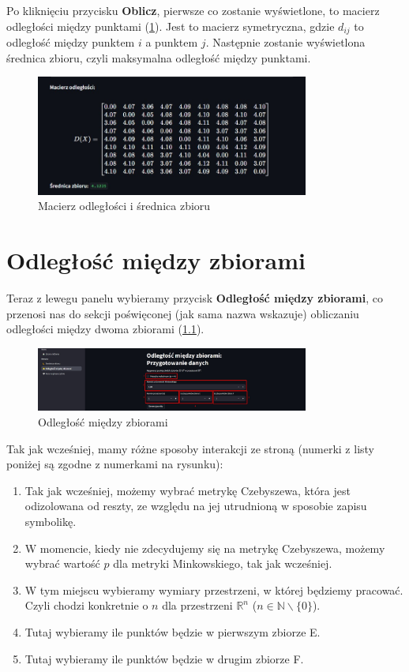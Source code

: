 \documentclass[article,11pt]{mwrep}
\newcommand{\R}{{\mathbb R}}
\newcommand{\N}{{\mathbb N}}
\begin{document}
Po kliknięciu przycisku \textbf{Oblicz}, pierwsze co zostanie wyświetlone, to macierz odległości między punktami (\ref{rys:mo}). Jest to macierz symetryczna, gdzie $d_{ij}$ to odległość między punktem $i$ a punktem $j$. Następnie zostanie wyświetlona średnica zbioru, czyli maksymalna odległość między punktami.

\begin{figure}[H] 
    \centering
    \includegraphics[width=0.8\textwidth]{figure/Screenshot_4.jpg}
    \caption{Macierz odległości i średnica zbioru}\label{rys:mo}
\end{figure}

\chapter{Odległość między zbiorami}

Teraz z lewegu panelu wybieramy przycisk \textbf{Odległość między zbiorami}, co przenosi nas do sekcji poświęconej (jak sama nazwa wskazuje) obliczaniu odległości między dwoma zbiorami (\ref{rys:omz}). 

\begin{figure}[H] 
    \centering
    \includegraphics[width=0.8\textwidth]{figure/Screenshot_5.jpg}
    \caption{Odległość między zbiorami}\label{rys:omz}
\end{figure}

Tak jak wcześniej, mamy różne sposoby interakcji ze stroną (numerki z listy poniżej są zgodne z numerkami na rysunku):

\begin{enumerate}
    \item Tak jak wcześniej, możemy wybrać metrykę Czebyszewa, która jest odizolowana od reszty, ze względu na jej utrudnioną w sposobie zapisu symbolikę.
    \item W momencie, kiedy nie zdecydujemy się na metrykę Czebyszewa, możemy wybrać wartość $p$ dla metryki Minkowskiego, tak jak wcześniej.
    \item W tym miejscu wybieramy wymiary przestrzeni, w której będziemy pracować. Czyli chodzi konkretnie o $n$ dla przestrzeni $\R^n$ ($n\in\N\backslash \{0\} $).
    \item Tutaj wybieramy ile punktów będzie w pierwszym zbiorze E.
    \item Tutaj wybieramy ile punktów będzie w drugim zbiorze F.
\end{enumerate}
\end{document}
